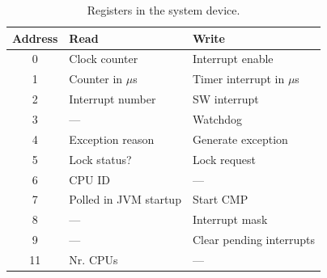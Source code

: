 \begin{table}
    \centering
    \begin{tabular}{cll}
        \toprule
        Address  & Read & Write \\
        \midrule
        0 & Clock counter & Interrupt enable \\
        1 & Counter in $\mu$s & Timer interrupt in $\mu$s \\
        2 & Interrupt number & SW interrupt \\
        3 & --- & Watchdog \\
        4 & Exception reason & Generate exception \\
        5 & Lock status? & Lock request \\
        6 & CPU ID & --- \\
        7 & Polled in JVM startup & Start CMP \\
        8 & --- & Interrupt mask \\
        9 & --- & Clear pending interrupts \\
        11 & Nr. CPUs & --- \\
        \bottomrule
    \end{tabular}
    \caption{Registers in the system device.}
    \label{tab:io:sysdev}
\end{table}
